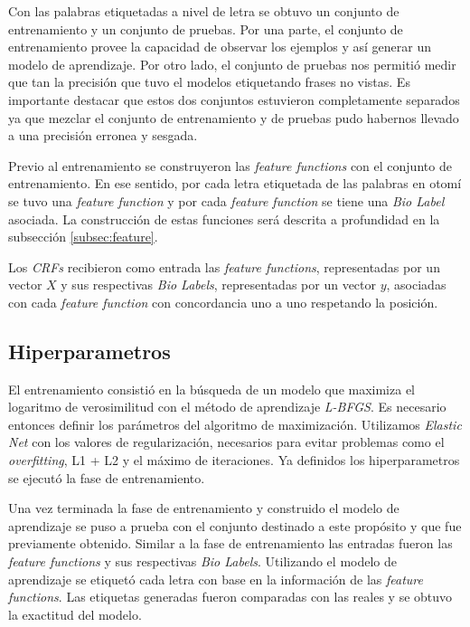 \documentclass[letterpaper,12pt,oneside]{scrbook}
\theoremstyle{definition}
\begin{document}
	
	Con las palabras etiquetadas a nivel de letra se obtuvo un conjunto de entrenamiento y un conjunto de pruebas. Por una parte, el conjunto de entrenamiento provee la capacidad de observar los ejemplos y así generar un modelo de aprendizaje. Por otro lado, el conjunto de pruebas nos permitió medir que tan la precisión que tuvo el modelos etiquetando frases no vistas. Es importante destacar que estos dos conjuntos estuvieron completamente separados ya que mezclar el conjunto de entrenamiento y de pruebas pudo habernos llevado a una precisión erronea y sesgada.

	
	Previo al entrenamiento se construyeron las \textit{feature functions} con el conjunto de entrenamiento. En ese sentido, por cada letra etiquetada de las palabras en otomí se tuvo una \textit{feature function} y por cada \textit{feature function} se tiene una \textit{Bio Label} asociada. La construcción de estas funciones será descrita a profundidad en la subsección \ref{subsec:feature}.

	

	
	Los \textit{CRFs} recibieron como entrada las \textit{feature functions}, representadas por un vector $X$ y sus respectivas \textit{Bio Labels}, representadas por un vector $y$, asociadas con cada \textit{feature function} con concordancia uno a uno respetando la posición. 

	
	\subsection{Hiperparametros}

	
	El entrenamiento consistió en la búsqueda de un modelo que maximiza el logaritmo de verosimilitud con el método de aprendizaje \textit{L-BFGS}. Es necesario entonces definir los parámetros del algoritmo de maximización. Utilizamos \textit{Elastic Net} con los valores de regularización, necesarios para evitar problemas como el \textit{overfitting}, L1 + L2 y el máximo de iteraciones. Ya definidos los hiperparametros se ejecutó la fase de entrenamiento.

	

	Una vez terminada la fase de entrenamiento y construido el modelo de aprendizaje se puso a prueba con el conjunto destinado a este propósito y que fue previamente obtenido. Similar a la fase de entrenamiento las entradas fueron las \textit{feature functions} y sus respectivas \textit{Bio Labels}. Utilizando el modelo de aprendizaje se etiquetó cada letra con base en la información de las \textit{feature functions}. Las etiquetas generadas fueron comparadas con las reales y se obtuvo la exactitud del modelo. 
\end{document}
